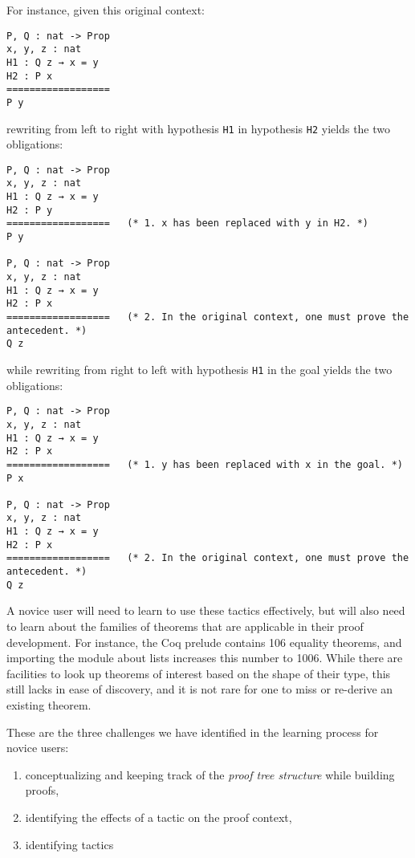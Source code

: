 For instance, given this original context:

\begin{verbatim}
P, Q : nat -> Prop
x, y, z : nat
H1 : Q z → x = y
H2 : P x
==================
P y
\end{verbatim}

rewriting from left to right with hypothesis \texttt{H1} in hypothesis
\texttt{H2} yields the two obligations:

\begin{verbatim}
P, Q : nat -> Prop
x, y, z : nat
H1 : Q z → x = y
H2 : P y
==================   (* 1. x has been replaced with y in H2. *)
P y

P, Q : nat -> Prop
x, y, z : nat
H1 : Q z → x = y
H2 : P x
==================   (* 2. In the original context, one must prove the antecedent. *)
Q z
\end{verbatim}

while rewriting from right to left with hypothesis \texttt{H1} in the
goal yields the two obligations:

\begin{verbatim}
P, Q : nat -> Prop
x, y, z : nat
H1 : Q z → x = y
H2 : P x
==================   (* 1. y has been replaced with x in the goal. *)
P x

P, Q : nat -> Prop
x, y, z : nat
H1 : Q z → x = y
H2 : P x
==================   (* 2. In the original context, one must prove the antecedent. *)
Q z
\end{verbatim}

A novice user will need to learn to use these tactics effectively, but will also
need to learn about the families of theorems that are applicable in their proof
development.  For instance, the Coq prelude contains 106 equality theorems, and
importing the module about lists increases this number to 1006.  While there are
facilities to look up theorems of interest based on the shape of their type,
this still lacks in ease of discovery, and it is not rare for one to miss or
re-derive an existing theorem.


These are the three challenges we have identified in the learning process for
novice users:

\begin{enumerate}

  \item conceptualizing and keeping track of the \emph{proof tree structure}
while building proofs,

  \item identifying the effects of a tactic on the proof context,

  \item identifying tactics

\end{enumerate}
